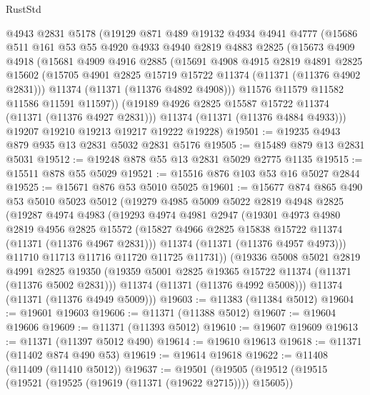 \begin{lexlean}{RustStd}
\begin{coremodule}
{\begin{coremodule}
{{{{{{{{{{{{{{{{{{{{{{{{{{{{{{{{{    @4943
    @2831
    @5178
    (@19129
      @871
      @489
      @19132
      @4934
      @4941
      @4777
      (@15686
        @511
        @161
        @53
        @55
        @4920
        @4933
        @4940
        @2819
        @4883
        @2825
        (@15673
          @4909
          @4918
          (@15681
            @4909
            @4916
            @2885
            (@15691
              @4908
              @4915
              @2819
              @4891
              @2825
              @15602
              (@15705 @4901 @2825 @15719 @15722 @11374 (@11371 (@11376 @4902 @2831)))
              @11374
              (@11371 (@11376 @4892 @4908)))
            @11576
            @11579
            @11582
            @11586
            @11591
            @11597))
        (@19189 @4926 @2825 @15587 @15722 @11374 (@11371 (@11376 @4927 @2831)))
        @11374
        (@11371 (@11376 @4884 @4933)))
      @19207
      @19210
      @19213
      @19217
      @19222
      @19228)
@19501 := @19235 @4943 @879 @935 @13 @2831 @5032 @2831 @5176
@19505 := @15489 @879 @13 @2831 @5031
@19512 := @19248 @878 @55 @13 @2831 @5029 @2775 @1135
@19515 := @15511 @878 @55 @5029
@19521 := @15516 @876 @103 @53 @16 @5027 @2844
@19525 := @15671 @876 @53 @5010 @5025
@19601 := @15677
    @874
    @865
    @490
    @53
    @5010
    @5023
    @5012
    (@19279
      @4985
      @5009
      @5022
      @2819
      @4948
      @2825
      (@19287
        @4974
        @4983
        (@19293
          @4974
          @4981
          @2947
          (@19301
            @4973
            @4980
            @2819
            @4956
            @2825
            @15572
            (@15827 @4966 @2825 @15838 @15722 @11374 (@11371 (@11376 @4967 @2831)))
            @11374
            (@11371 (@11376 @4957 @4973)))
          @11710
          @11713
          @11716
          @11720
          @11725
          @11731))
      (@19336
        @5008
        @5021
        @2819
        @4991
        @2825
        @19350
        (@19359 @5001 @2825 @19365 @15722 @11374 (@11371 (@11376 @5002 @2831)))
        @11374
        (@11371 (@11376 @4992 @5008)))
      @11374
      (@11371 (@11376 @4949 @5009)))
@19603 := @11383 (@11384 @5012)
@19604 := @19601 @19603
@19606 := @11371 (@11388 @5012)
@19607 := @19604 @19606
@19609 := @11371 (@11393 @5012)
@19610 := @19607 @19609
@19613 := @11371 (@11397 @5012 @490)
@19614 := @19610 @19613
@19618 := @11371 (@11402 @874 @490 @53)
@19619 := @19614 @19618
@19622 := @11408 (@11409 (@11410 @5012))
@19637 := @19501
    (@19505
      (@19512
        (@19515 (@19521 (@19525 (@19619 (@11371 (@19622 @2715)))) @15605))
}}}}}}}}}}}}}}}}}}}}}}}}}}}}}}}}}
\end{coremodule}}
\end{coremodule}
\end{lexlean}
